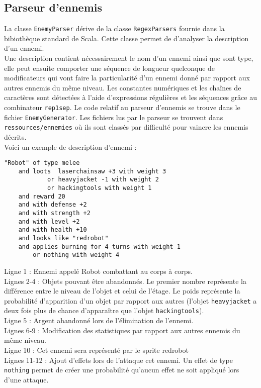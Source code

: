 \documentclass[10pt,a4paper]{article}
\begin{document}
\subsection{Parseur d'ennemis}
La classe \texttt{EnemyParser} dérive de la classe \texttt{RegexParsers} fournie dans la bibiothèque standard de Scala. Cette classe permet de d'analyser la description d'un ennemi.\\
Une description contient nécessairement le nom d'un ennemi ainsi que sont type, elle peut ensuite comporter une séquence de longueur quelconque de modificateurs qui vont faire la particularité d'un ennemi donné par rapport aux autres ennemis du même niveau. Les constantes numériques et les chaînes de caractères sont détectées à l'aide d'expressions régulières et les séquences grâce au combinateur \texttt{rep1sep}. Le code relatif au parseur d'ennemis se trouve dans le fichier \texttt{EnemyGenerator}. Les fichiers lus par le parseur se trouvent dans \texttt{ressources/ennemies} où ils sont classés par difficulté pour vaincre les ennemis décrits.\\
Voici un exemple de description d'ennemi :
\begin{Verbatim}
"Robot" of type melee
    and loots  laserchainsaw +3 with weight 3
            or heavyjacket -1 with weight 2
            or hackingtools with weight 1       
    and reward 20                            
    and with defense +2
    and with strength +2
    and with level +2
    and with health +10
    and looks like "redrobot"
    and applies burning for 4 turns with weight 1
        or nothing with weight 4                 
\end{Verbatim}
Ligne 1 : Ennemi appelé Robot combattant au corps à corps.\\
Lignes 2-4 : Objets pouvant être abandonnés. Le premier nombre représente la différence entre le niveau de l'objet et celui de l'étage. Le poids représente la probabilité d'apparition d'un objet par rapport aux autres (l'objet \texttt{heavyjacket} a deux fois plus de chance d'apparaître que l'objet \texttt{hackingtools}).\\
Ligne 5 : Argent abandonné lors de l'élimination de l'ennemi.
\\Lignes 6-9 : Modification des statistiques par rapport aux autres ennemis du même niveau.
\\Ligne 10 : Cet ennemi sera représenté par le sprite redrobot
\\Lignes 11-12 : Ajout d'effets lors de l'attaque cet ennemi. Un effet de type \texttt{nothing} permet de créer une probabilité qu'aucun effet ne soit appliqué lors d'une attaque.
\end{document}
